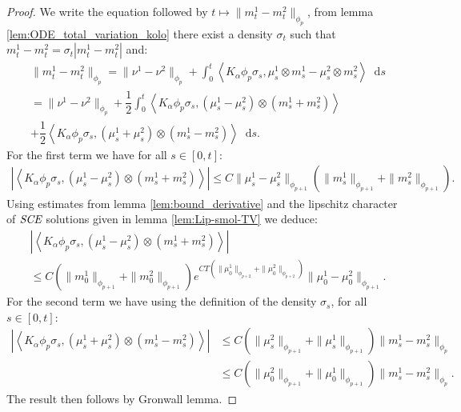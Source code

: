 \documentclass[11pt,a4paper]{article}
\newcommand{\SCE}{\emph{SCE}}
\newcommand{\brac}[1]{\left\langle#1\right\rangle}
\newcommand{\dd}{\mathop{}\!\mathrm{d}}
\begin{document}
\begin{proof}
    We write the equation followed by $t \mapsto \| m^1_t - m^2_t \|_{\phi_p}$, from lemma \ref{lem:ODE_total_variation_kolo} there exist a density $\sigma_t$ such that $m^1_t - m^2_t = \sigma_t|m^1_t - m^2_t|$ and:
    \begin{multline*}
        \| m^1_t - m^2_t \|_{\phi_p} = \|\nu^1- \nu^2 \|_{\phi_{p}} + \int_0^t \brac{K_\alpha\phi_p\sigma_s, \mu^1_s\otimes m^1_s - \mu^2_s\otimes m^2_s} \dd s \\
        = \|\nu^1- \nu^2 \|_{\phi_{p}} + \dfrac12\int_0^t \brac{K_\alpha\phi_p\sigma_s, (\mu^1_s - \mu^2_s)\otimes (m^1_s + m^2_s) } \\
        + \dfrac12\brac{K_\alpha\phi_p\sigma_s, (\mu^1_s + \mu^2_s)\otimes (m^1_s - m^2_s)} \dd s.
    \end{multline*}
    For the first term we have for all $s \in [0,t]$:
    \begin{align*}
        \left| \brac{K_\alpha\phi_p\sigma_s, (\mu^1_s - \mu^2_s)\otimes (m^1_s + m^2_s)}\right| \leq C\| \mu^1_s - \mu^2_s\|_{\phi_{p+1}} \left(\| m^1_s\|_{\phi_{p+1}} + \| m^2_s\|_{\phi_{p+1}}\right).
    \end{align*}
    Using estimates from lemma \ref{lem:bound_derivative} and the lipschitz character of $\SCE$ solutions given in lemma \ref{lem:Lip-smol-TV} we deduce:
    \begin{multline*}
        \left| \brac{K_\alpha\phi_p\sigma_s, (\mu^1_s - \mu^2_s)\otimes (m^1_s + m_s^2) }\right| \\
        \leq C(\|m^1_0\|_{\phi_{p+1}}+ \|m^2_0\|_{\phi_{p+1}})e^{CT\left(\|\mu^1_0\|_{\phi_{p +2}} + \|\mu^2_0\|_{\phi_{p +2}}\right)} \|\mu_0^1 - \mu_0^2\|_{\phi_{p+1}}.
    \end{multline*}
    For the second term we have using the definition of the density $\sigma_s$, for all $s \in [0,t]$:
    \begin{align*}
        \left| \brac{K_\alpha\phi_p\sigma_s, (\mu^1_s + \mu^2_s)\otimes (m^1_s - m^2_s)} \right| 
        &\leq C \left(\| \mu^2_s\|_{\phi_{p+1}} + \| \mu^1_s\|_{\phi_{p+1}}\right)\|m^1_s - m^2_s \|_{\phi_p} \\
        &\leq C \left(\| \mu^2_0\|_{\phi_{p+1}} + \| \mu^1_0\|_{\phi_{p+1}}\right)\|m^1_s - m^2_s \|_{\phi_p}.
    \end{align*}
    The result then follows by Gronwall lemma.
\end{proof}
\end{document}
